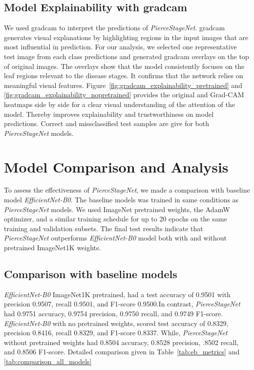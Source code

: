 \documentclass[conference]{IEEEtran}
\begin{document}
\subsection{Model Explainability with \ac{gradcam}}
We used \ac{gradcam} \cite{Selvaraju_2017_ICCV} to interpret the predictions of \textit{PierceStageNet}. \ac{gradcam} generates visual explanations by highlighting regions in the input images that are most influential in prediction. For our analysis, we selected one representative test image from each class predictions and generated \ac{gradcam} overlays on the top of original images. The overlays show that the model consistently focuses on the leaf regions relevant to the disease stages. It confirms that the network relies on meaningful visual features. Figure~\ref{fig:gradcam_explainability_pretrained} and \ref{fig:gradcam_explainability_nopretrained} provides the original and Grad-CAM heatmaps side by side for a clear visual understanding of the attention of the model. Thereby improves explainability and trustworthiness on model predictions. Correct and missclassified test samples are give for both \textit{PierceStageNet} models.

\section{Model Comparison and Analysis}
\label{sec:comparison}
To assess the effectiveness of \textit{PierceStageNet}, we made a comparison with baseline model \textit{EfficientNet-B0}. The baseline models was trained in same conditions as \textit{PierceStageNet} models. We used ImageNet pretrained weights, the AdamW optimizer, and a similar training schedule for up to 20 epochs on the same training and validation subsets. The final test results indicate that \textit{PierceStageNet} outperforms \textit{EfficientNet-B0} model both with and without pretrained ImageNet1K weights.
\subsection{Comparison with baseline models}
\textit{EfficientNet-B0} ImageNet1K pretrained, had a test accuracy of 0.9501 with precision 0.9507, recall 0.9501, and F1-score 0.9500.In contrast, \textit{PierceStageNet} had 0.9751 accuracy, 0.9754 precision, 0.9750 recall, and 0.9749 F1-score.
\textit{EfficientNet-B0} with no pretrained weights, scored test accuracy of 0.8329, precision 0.8416, recall 0.8329, and F1-score 0.8337. While, \textit{PierceStageNet} without pretrained weights had 0.8504 accuracy, 0.8528 precision, .8502 recall, and 0.8506 F1-score. Detailed comparison given in Table~\ref{tab:eb_metrics} and \ref{tab:comparison_all_models}
\end{document}
